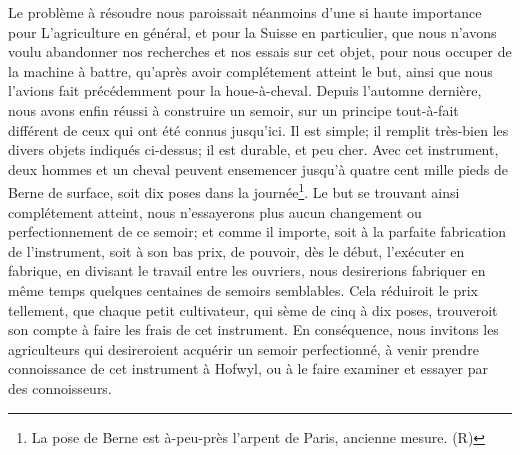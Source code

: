 Le problème à résoudre nous paroissait néanmoins d'une si haute importance pour\setcounter{page}{116} L'agriculture en général, et pour la Suisse en particulier, que nous n'avons voulu abandonner nos recherches et nos essais sur cet objet, pour nous occuper de la machine à battre, qu'après avoir complétement atteint le but, ainsi que nous l'avions fait précédemment pour la houe-à-cheval. Depuis l'automne dernière, nous avons enfin réussi à construire un semoir, sur un principe tout-à-fait différent de ceux qui ont été connus jusqu'ici. Il est simple; il remplit très-bien les divers objets indiqués ci-dessus; il est durable, et peu cher. Avec cet instrument, deux hommes et un cheval peuvent ensemencer jusqu'à quatre cent mille pieds de Berne de surface, soit dix poses dans la journée\footnote{La pose de Berne est à-peu-près l'arpent de Paris, ancienne mesure. (R)}.
Le but se trouvant ainsi complétement atteint, nous n'essayerons plus aucun changement ou perfectionnement de ce semoir; et comme il importe, soit à la parfaite fabrication de l'instrument, soit à son bas prix, de pouvoir, dès le début, l'exécuter en fabrique, en divisant le travail entre les ouvriers, nous desirerions fabriquer en même temps quelques centaines de semoirs semblables. Cela réduiroit le prix tellement, que chaque petit cultivateur, qui sème de cinq à dix poses, trouveroit son compte à faire les frais de cet instrument.
En conséquence, nous invitons les agriculteurs qui desireroient acquérir un semoir perfectionné, à venir prendre connoissance de cet instrument à Hofwyl, ou à le faire examiner et essayer par des connoisseurs.